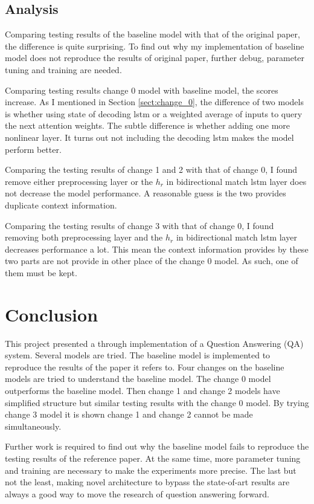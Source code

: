 \documentclass[modernstyle,12pt]{sjsuthesis}
\theoremstyle{definition}
\begin{document}
\section{Analysis}

Comparing testing results of the baseline model with that of the original paper, the difference is quite surprising. To find out why my implementation of baseline model does not reproduce the results of original paper, further debug, parameter tuning and training are needed.

Comparing testing results change 0 model with baseline model, the scores increase. As I mentioned in Section \ref{sect:change_0}, the difference of two models is whether using state of decoding lstm or a weighted average of inputs to query the next attention weights. The subtle difference is whether adding one more nonlinear layer. It turns out not including the decoding lstm makes the model perform better.

Comparing the testing results of change 1 and 2 with that of change 0, I found remove either preprocessing layer or the $h_r$ in bidirectional match lstm layer does not decrease the model performance. A reasonable guess is the two provides duplicate context information.

Comparing the testing results of change 3 with that of change 0, I found removing both preprocessing layer and the $h_r$ in bidirectional match lstm layer decreases performance a lot. This mean the context information provides by these two parts are not provide in other place of the change 0 model. As such, one of them must be kept.





\chapter{Conclusion}

This project presented a through implementation of a Question Answering (QA) system. Several models are tried. The baseline model is implemented to reproduce the results of the paper it refers to. Four changes on the baseline models are tried to understand the baseline model. The change 0 model outperforms the baseline model. Then change 1 and change 2 models have simplified structure but similar testing results with the change 0 model. By trying change 3 model it is shown change 1 and change 2 cannot be made simultaneously.

Further work is required to find out why the baseline model fails to reproduce the testing results of the reference paper. At the same time, more parameter tuning and training are necessary to make the experiments more precise. The last but not the least, making novel architecture to bypass the state-of-art results are always a good way to move the research of question answering forward.
\end{document}
